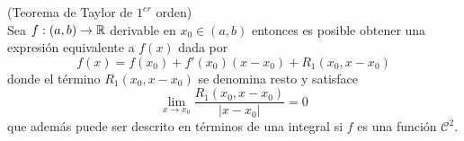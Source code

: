 


\begin{teorema}{\rm (Teorema de Taylor de $1^{er}$ orden)}  \label{taylor1}
\\Sea $f:(a,b)\to\mathbb{R}$ derivable en $x_0\in (a,b)$ entonces es posible obtener una expresi\'on equivalente a $f(x)$ dada por
$$f(x)=f(x_0)+f'(x_0)(x-x_0)+R_1(x_0,x-x_0)$$
donde el t\'ermino $R_1(x_0,x-x_0)$ se denomina resto y satisface
$$\lim_{x\to x_0}\frac{R_1(x_0,x-x_0)}{|x-x_0|}=0$$
que adem\'as puede ser descrito en t\'erminos de una integral si $f$ es una funci\'on $\mathcal{C}^2$.
\end{teorema}

